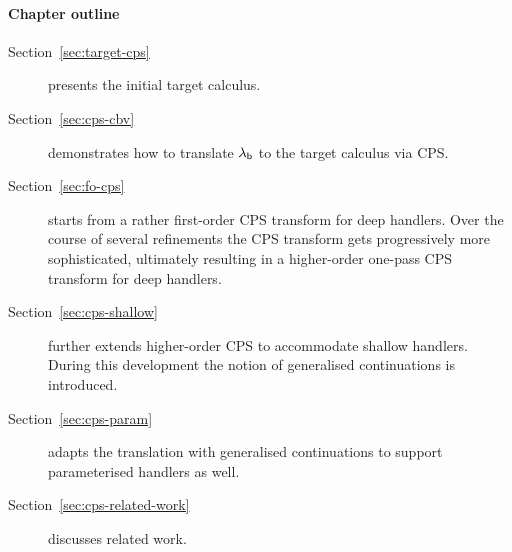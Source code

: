\documentclass[12pt,phd,lfcs,twoside,openright,logo,leftchapter,normalheadings]{infthesis}
\theoremstyle{plain}
\theoremstyle{definition}
\newtheorem{definition}[theorem]{Definition}
\begin{document}
%
%


\paragraph{Chapter outline}
\begin{description}
\item[Section~\ref{sec:target-cps}] presents the initial target calculus.
\item[Section~\ref{sec:cps-cbv}] demonstrates how to translate
  $\lambda_{\mathsf{b}}$ to the target calculus via CPS.
\item[Section~\ref{sec:fo-cps}] starts from a rather \naive
  first-order CPS transform for deep handlers. Over the course of
  several refinements the \naive CPS transform gets progressively more
  sophisticated, ultimately resulting in a higher-order one-pass CPS
  transform for deep handlers.
\item[Section~\ref{sec:cps-shallow}] further extends higher-order CPS
  to accommodate shallow handlers. During this development the notion
  of generalised continuations is introduced.
\item[Section~\ref{sec:cps-param}] adapts the translation with
  generalised continuations to support parameterised handlers as well.
\item[Section~\ref{sec:cps-related-work}] discusses related work.
\end{description}
\end{document}
